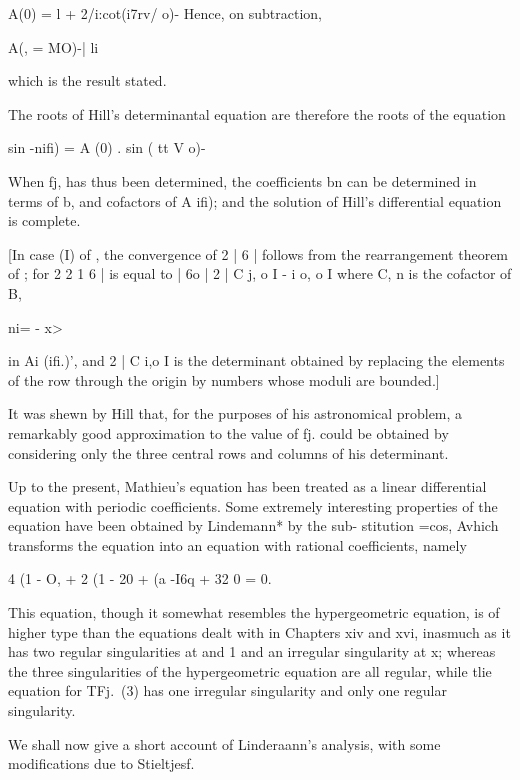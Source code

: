 A(0) = l + 2/i:cot(i7rv/ o)- Hence, on subtraction,

A(, = MO)-| li

which is the result stated.

The roots of Hill's determinantal equation are therefore the roots of
the equation

sin -nifi) = A (0) . sin ( tt V o)-

When fj, has thus been determined, the coefficients bn can be
determined in terms of b, and cofactors of A ifi); and the solution
of Hill's differential equation is complete.

%
%

[In case (I) of , the convergence of 2 | 6 | follows from the
rearrangement theorem of ; for 2 2 1 6 | is equal to | 6o | 2 |
C j, o I - i o, o I where C, n is the cofactor of B,

ni= - x>

in Ai (ifi.)', and 2 | C i,o I is the determinant obtained by
replacing the elements of the row through the origin by numbers whose
moduli are bounded.]

It was shewn by Hill that, for the purposes of his astronomical
problem, a remarkably good approximation to the value of fj. could be
obtained by considering only the three central rows and columns of his
determinant.


Up to the present, Mathieu's equation has been treated as a linear
differential equation with periodic coefficients. Some extremely
interesting properties of the equation have been obtained by
Lindemann* by the sub- stitution =cos, Avhich transforms the equation
into an equation with rational coefficients, namely

4 (1 - O, + 2 (1 - 20 + (a -I6q + 32 0 = 0.

This equation, though it somewhat resembles the hypergeometric
equation, is of higher type than the equations dealt with in Chapters
xiv and xvi, inasmuch as it has two regular singularities at and 1 and
an irregular singularity at x; whereas the three singularities of the
hypergeometric equation are all regular, while tlie equation for TFj.\
(3) has one irregular singularity and only one regular singularity.

We shall now give a short account of Linderaann's analysis, with some
modifications due to Stieltjesf.

